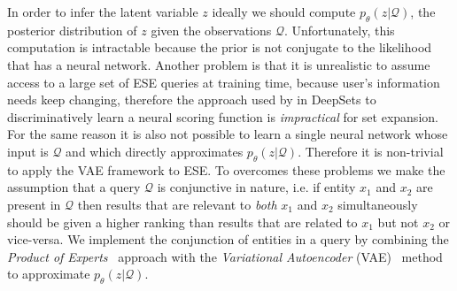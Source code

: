 \documentclass[a4paper]{article}
\newcommand{\cQ}{\mathcal{Q}}
\newcommand{\mycite}[1]{\cite{#1}}%
\newcommand{\myciteauthor}[1]{\cite{#1}}%
\begin{document}
In order to infer the latent variable $z$ ideally we should compute $p_\theta(z|\cQ)$, the posterior distribution of $z$ given the observations $\cQ$. Unfortunately, this computation is intractable because the prior is not conjugate to the likelihood that has a neural network. Another problem is that it is unrealistic to assume access to a large set of ESE queries at training time, because user's information needs keep changing, therefore the approach used by \myciteauthor{manzil2017deep} in DeepSets to discriminatively learn a neural scoring function is \textit{impractical} for set expansion. For the same reason it is also not possible to learn a single neural network whose input is $\cQ$ and which directly approximates $p_\theta(z|\cQ)$. Therefore it is non-trivial to apply the VAE framework to ESE. To overcomes these problems we make the assumption that a query $\cQ$ is conjunctive in nature, i.e. if entity $x_1$ and $x_2$ are present in $\cQ$ then results that are relevant to \textit{both} $x_1$ and $x_2$ simultaneously should be given a higher ranking than results that are related to $x_1$ but not $x_2$ or vice-versa. We implement the conjunction of entities in a query by combining the
\textit{Product of Experts}~\mycite{hinton1999products} approach with the \textit{Variational Autoencoder} (VAE)~\mycite{kingma2013auto} method to approximate $p_\theta(z|\cQ)$.
\end{document}
